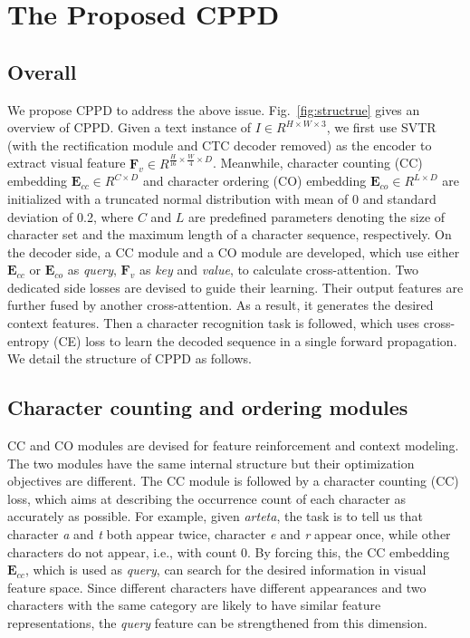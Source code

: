 \documentclass[10pt,journal,compsoc]{IEEEtran}
\begin{document}
\section{The Proposed CPPD}
\label{sec:formatting}

\subsection{Overall}
We propose CPPD to address the above issue. Fig.~\ref{fig:structrue} gives an overview of CPPD. Given a text instance of $I \in R^{H \times W \times 3}$, we first use SVTR \cite{duijcai2022svtr} (with the rectification module and CTC decoder removed) as the encoder to extract visual feature $\mathbf{F}_v \in R^{ \frac{H}{16} \times \frac{W}{4} \times D}$. Meanwhile, character counting (CC) embedding $\mathbf{E}_{cc} \in R^{C \times D}$ and character ordering (CO) embedding $\mathbf{E}_{co} \in R^{L \times D}$ are initialized with a truncated normal distribution with mean of 0 and standard deviation of 0.2, where $C$ and $L$ are predefined parameters denoting the size of character set and the maximum length of a character sequence, respectively. On the decoder side, a CC module and a CO module are developed, which use either $\mathbf{E}_{cc}$ or $\mathbf{E}_{co}$ as \emph{query}, $\mathbf{F}_v$ as \emph{key} and \emph{value}, to calculate cross-attention. Two dedicated side losses are devised to guide their learning. Their output features are further fused by another cross-attention. As a result, it generates the desired context features. Then a character recognition task is followed, which uses cross-entropy (CE) loss to learn the decoded sequence in a single forward propagation. We detail the structure of CPPD as follows. 

\subsection{Character counting and ordering modules}
CC and CO modules are devised for feature reinforcement and context modeling. The two modules have the same internal structure but their optimization objectives are different. The CC module is followed by a character counting (CC) loss, which aims at describing the occurrence count of each character as accurately as possible. For example, given \emph{arteta}, the task is to tell us that character \emph{a} and \emph{t} both appear twice, character \emph{e} and \emph{r} appear once, while other characters do not appear, i.e., with count 0. By forcing this, the CC embedding $\mathbf{E}_{cc}$, which is used as \emph{query}, can search for the desired information in visual feature space. Since different characters have different appearances and two characters with the same category are likely to have similar feature representations, the \emph{query} feature can be strengthened from this dimension. 
\end{document}
